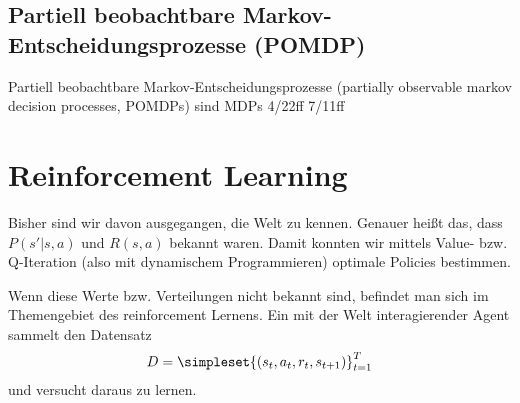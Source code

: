 \documentclass[ngerman]{../LaTeX-Templates/Paper/paper}
\begin{document}
\subsection{Partiell beobachtbare Markov-Entscheidungsprozesse (POMDP)}
Partiell beobachtbare Markov-Entscheidungsprozesse (partially observable markov decision processes, POMDPs) sind MDPs
4/22ff
7/11ff


















\section{Reinforcement Learning}
Bisher sind wir davon ausgegangen, die Welt zu kennen. Genauer heißt das, dass $P(s'|s,a)$ und $R(s,a)$ bekannt waren. Damit konnten wir mittels Value- bzw. Q-Iteration (also mit dynamischem Programmieren) optimale Policies bestimmen.

Wenn diese Werte bzw. Verteilungen nicht bekannt sind, befindet man sich im Themengebiet des reinforcement Lernens.
Ein mit der Welt interagierender Agent sammelt den Datensatz
\begin{equation*}
	D=\simpleset{(s_t,a_t,r_t,s_{t+1})}_{t=1}^T
\end{equation*}
und versucht daraus zu lernen.
\end{document}
